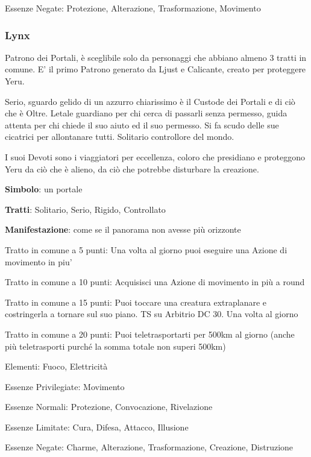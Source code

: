 \documentclass[a4paper,11pt,twoside,openany]{book}
\begin{document}
Essenze Negate: Protezione, Alterazione, Trasformazione, Movimento

\subsubsection{Lynx}

\label{lynx}

Patrono dei Portali, è sceglibile solo da personaggi che abbiano almeno 3 tratti in comune. E' il primo Patrono generato da Ljust e Calicante, creato per proteggere Yeru.

Serio, sguardo gelido di un azzurro chiarissimo è il Custode dei Portali e di ciò che è Oltre. Letale guardiano per chi cerca di passarli senza permesso, guida attenta per chi chiede il suo aiuto ed il suo permesso. Si fa scudo delle sue cicatrici per allontanare tutti.
Solitario controllore del mondo.

I suoi Devoti sono i viaggiatori per eccellenza, coloro che presidiano e proteggono Yeru da ciò che è alieno, da ciò che potrebbe disturbare la creazione.

\textbf{Simbolo}: un portale

\textbf{Tratti}: Solitario, Serio, Rigido, Controllato

\textbf{Manifestazione}: come se il panorama non avesse più orizzonte

\bigskip

Tratto in comune a 5 punti: Una volta al giorno puoi eseguire una Azione di movimento in piu'

Tratto in comune a 10 punti: Acquisisci una Azione di movimento in più a round

Tratto in comune a 15 punti: Puoi toccare una creatura extraplanare e costringerla a tornare sul suo piano. TS su Arbitrio DC 30. Una volta al giorno

Tratto in comune a 20 punti: Puoi teletrasportarti per 500km al giorno (anche più teletrasporti purché la somma totale non superi 500km)

\bigskip

Elementi: Fuoco, Elettricità

\bigskip

Essenze Privilegiate: Movimento

Essenze Normali: Protezione, Convocazione, Rivelazione

Essenze Limitate: Cura, Difesa, Attacco, Illusione

Essenze Negate: Charme, Alterazione, Trasformazione, Creazione, Distruzione
\end{document}
